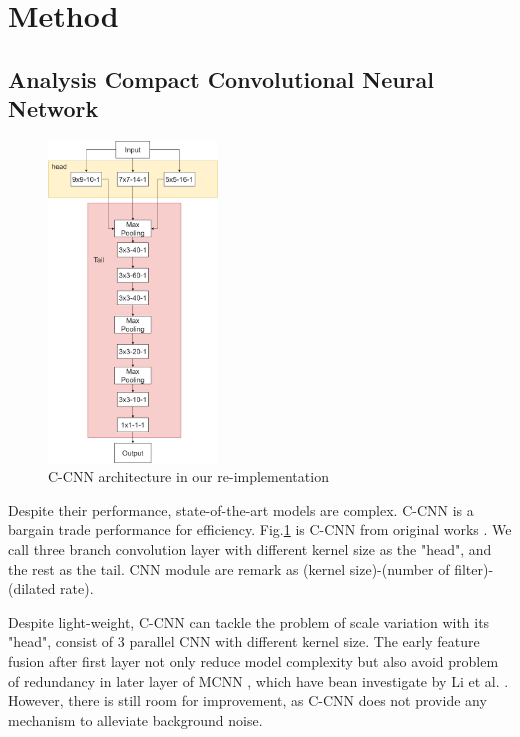 \section{Method}


\subsection{Analysis Compact Convolutional Neural Network}

\begin{figure}[htbp]
\centerline{\includegraphics[width=0.4\textwidth]{Picture/proposed/ccnn_original_fix1.png}}
\caption{C-CNN architecture in our re-implementation}
\label{fig:ccnn}
\end{figure}



Despite their performance, state-of-the-art models are complex. C-CNN is a bargain trade performance for efficiency. Fig.\ref{fig:ccnn} is C-CNN from original works \cite{9053780}. We call three branch convolution layer with different kernel size as the "head", and the rest as the tail. CNN module are remark as (kernel size)-(number of filter)-(dilated rate). 

Despite light-weight, C-CNN can tackle the problem of scale variation with its "head", consist of 3 parallel CNN with different kernel size. The early feature fusion after first layer not only reduce model complexity but also avoid problem of redundancy in later layer of MCNN \cite{zhang2016single}, which have bean investigate by Li et al. \cite{li2018csrnet}. 
However, there is still room for improvement, as C-CNN does not provide any mechanism to alleviate background noise.

